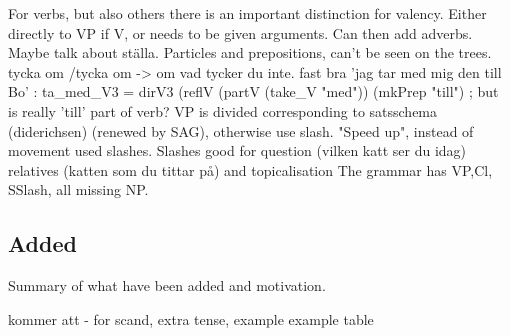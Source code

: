 \documentclass{report}
\begin{document}
For verbs, but also others there is an important distinction for valency.
Either directly to VP if V, or needs to be given arguments. Can then add adverbs.
Maybe talk about ställa.
Particles and prepositions, can't be seen on the trees.
tycka om /tycka om -> om vad tycker du inte. fast bra
'jag tar med mig den till Bo' : ta\_med\_V3 = dirV3 (reflV (partV (take\_V "med")) (mkPrep "till") ;
but is really 'till' part of verb?
VP is divided corresponding to satsschema (diderichsen) (renewed by SAG),
otherwise use slash.
"Speed up", instead of movement used slashes\cite{gazdar}.
Slashes good for question (vilken katt ser du idag)
relatives (katten som du tittar på) and topicalisation
The grammar has VP,Cl, SSlash, all missing NP.



\subsection{Added}
\label{sec:Added}
Summary of what have been added and motivation.

kommer att - for scand, extra tense, example
example table

\end{document}
